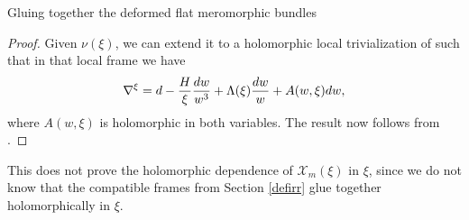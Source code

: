 \documentclass[11pt]{article}
\numberwithin{equation}{section}
\numberwithin{equation}{section}
\begin{document}
\begin{subsubsection}{Gluing together the deformed flat meromorphic bundles}
\begin{proof}
Given $\nu(\xi)$, we can extend it to a holomorphic local trivialization of  such that in that local frame we have
\begin{equation*}
 \nabla^{\xi}= {\rm d} -\frac{H}{\xi}\frac{{\rm d}w}{w^3}+\Lambda(\xi)\frac{{\rm d}w}{w} + A(w,\xi){\rm d}w,
\end{equation*}
where $A(w,\xi)$ is holomorphic in both variables. The result now follows from \cite[Lemma~7 and Corollary~8]{B2}.
\end{proof}

This does not prove the holomorphic dependence of $\mathcal{X}_m(\xi)$ in $\xi$, since we do not know that the compatible frames  from Section \ref{defirr} glue together holomorphically in $\xi$.
\end{subsubsection}
\end{document}
